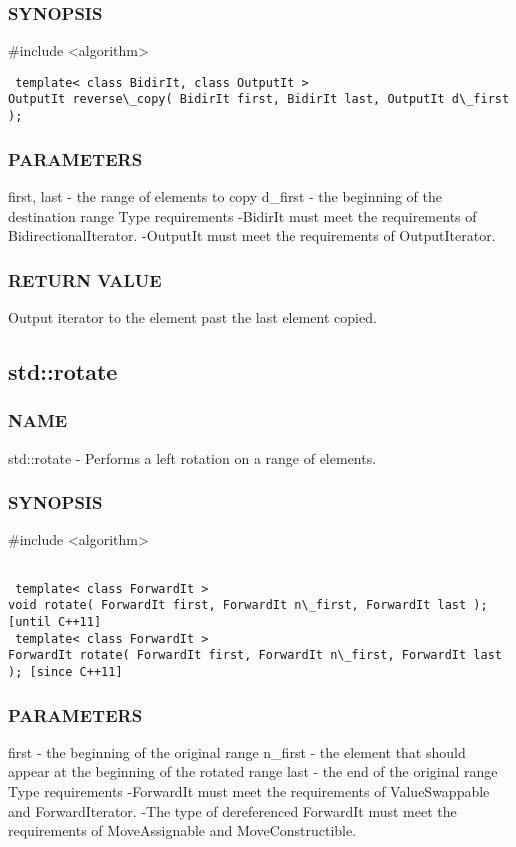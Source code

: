 \subsubsection{SYNOPSIS}
\#include <algorithm>

\begin{lstlisting}
 template< class BidirIt, class OutputIt >
OutputIt reverse\_copy( BidirIt first, BidirIt last, OutputIt d\_first );
\end{lstlisting}

\subsubsection{PARAMETERS}
first, last - the range of elements to copy
d\_first - the beginning of the destination range
 Type requirements
 -BidirIt must meet the requirements of BidirectionalIterator.
 -OutputIt must meet the requirements of OutputIterator.

\subsubsection{RETURN VALUE}
Output iterator to the element past the last element copied.



\subsection{std::rotate}

\subsubsection{NAME}
std::rotate - Performs a left rotation on a range of elements.

\subsubsection{SYNOPSIS}
\#include <algorithm>

\begin{lstlisting}

 template< class ForwardIt >
void rotate( ForwardIt first, ForwardIt n\_first, ForwardIt last ); [until C++11]
 template< class ForwardIt >
ForwardIt rotate( ForwardIt first, ForwardIt n\_first, ForwardIt last ); [since C++11]
\end{lstlisting}

\subsubsection{PARAMETERS}
first - the beginning of the original range
n\_first - the element that should appear at the beginning of the rotated range
last - the end of the original range
 Type requirements
 -ForwardIt must meet the requirements of ValueSwappable and ForwardIterator.
 -The type of dereferenced ForwardIt must meet the requirements of MoveAssignable and MoveConstructible.

